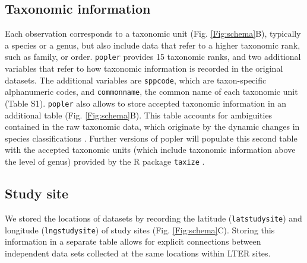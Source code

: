 \documentclass{article}\usepackage[]{graphicx}\usepackage[]{color}
\begin{document}
\subsection*{Taxonomic information}
Each observation corresponds to a taxonomic unit (Fig. \ref{Fig:schema}B), typically a species or a genus, but also include data that refer to a higher taxonomic rank, such as family, or order. %
\texttt{popler} provides 15 taxonomic ranks, and two additional variables that refer to how taxonomic information is recorded in the original datasets. The additional variables are \texttt{sppcode}, which are taxon-specific alphanumeric codes, and \texttt{common\textunderscore name}, the common name of each taxonomic unit (Table S1). \texttt{popler} also allows to store accepted taxonomic information in an additional table (Fig. \ref{Fig:schema}B). This table accounts for ambiguities contained in the raw taxonomic data, which originate by the dynamic changes in species classifications \citep{Chamberlain2013}. Further versions of popler will populate this second table with the accepted taxonomic units (which include  taxonomic information above the level of genus) provided by the R package \texttt{taxize} \citep{Chamberlain2013}.

\subsection*{Study site}
We stored the locations of datasets by recording the latitude (\texttt{lat\textunderscore study\textunderscore site}) and longitude (\texttt{lng\textunderscore study\textunderscore site}) of study sites (Fig. \ref{Fig:schema}C). Storing this information in a separate table allows for explicit connections between independent data sets collected at the same locations within LTER sites. 
\end{document}
